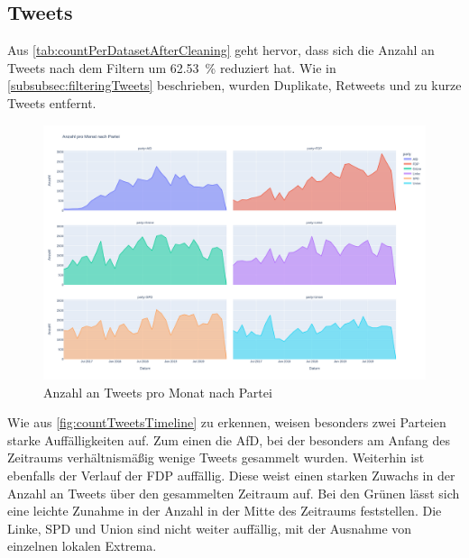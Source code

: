 \subsection*{Tweets}

Aus \autoref{tab:countPerDatasetAfterCleaning} geht hervor, dass sich die Anzahl an Tweets nach dem Filtern um \SI{62.53}{\percent} reduziert hat. Wie in \autoref{subsubsec:filteringTweets} beschrieben, wurden Duplikate, Retweets und zu kurze Tweets entfernt.


\begin{figure}[H]
    \centering
    \includegraphics[width=\linewidth]{data/images/tweets/anzahl_pro_monat_nach_partei.png}
    \caption{Anzahl an Tweets pro Monat nach Partei} \label{fig:countTweetsTimeline}
\end{figure}

Wie aus \autoref{fig:countTweetsTimeline} zu erkennen, weisen besonders zwei Parteien starke Auffälligkeiten auf. Zum einen die \ac{AfD}, bei der besonders am Anfang des Zeitraums verhältnismäßig wenige Tweets gesammelt wurden. Weiterhin ist ebenfalls der Verlauf der \ac{FDP} auffällig. Diese weist einen starken Zuwachs in der Anzahl an Tweets über den gesammelten Zeitraum auf. Bei den Grünen lässt sich eine leichte Zunahme in der Anzahl in der Mitte des Zeitraums feststellen. Die Linke, \ac{SPD} und Union sind nicht weiter auffällig, mit der Ausnahme von einzelnen lokalen Extrema.


